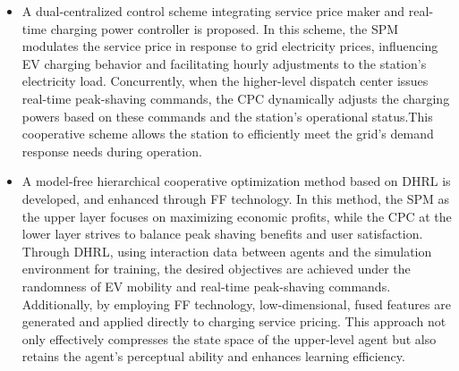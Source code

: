 \documentclass[preprint,12pt]{elsarticle}
\begin{document}
\begin{itemize}
\item A dual-centralized control scheme integrating service price maker and real-time charging power controller is proposed. In this scheme, the SPM modulates the service price in response to grid electricity prices, influencing EV charging behavior and facilitating hourly adjustments
to the station's electricity load. Concurrently, when the higher-level
dispatch center issues real-time peak-shaving commands, the CPC dynamically
adjusts the charging powers based on these commands and the station's
operational status.This cooperative scheme allows the station
to efficiently meet the grid's demand response needs during operation.
\item A model-free hierarchical cooperative optimization method based on DHRL is developed, and enhanced through FF technology. In this method, the SPM as the upper layer focuses on maximizing economic profits, while the CPC at the lower layer strives to balance peak shaving benefits and user satisfaction. Through DHRL, using interaction data between agents and the simulation environment for training, the desired objectives are achieved under the randomness of EV mobility and real-time peak-shaving commands. Additionally, by employing FF technology, low-dimensional, fused features are generated and applied directly to charging service pricing. This approach not only effectively compresses the state space of the upper-level agent but also retains the agent's perceptual ability and enhances learning efficiency.
\end{itemize}
\end{document}
